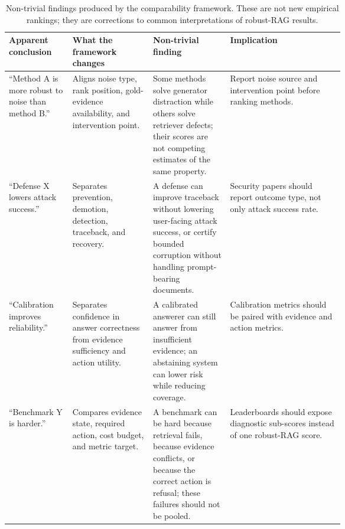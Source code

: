 \begin{table}[t]
\centering
\scriptsize
\renewcommand{\arraystretch}{0.9}
\begin{tabularx}{\linewidth}{>{\raggedright\arraybackslash}p{0.19\linewidth}>{\raggedright\arraybackslash}p{0.24\linewidth}>{\raggedright\arraybackslash}p{0.23\linewidth}X}
\toprule
\textbf{Apparent conclusion} & \textbf{What the framework changes} & \textbf{Non-trivial finding} & \textbf{Implication} \\
\midrule
``Method A is more robust to noise than method B.'' & Aligns noise type, rank position, gold-evidence availability, and intervention point. & Some methods solve generator distraction while others solve retriever defects; their scores are not competing estimates of the same property. & Report noise source and intervention point before ranking methods. \\
``Defense X lowers attack success.'' & Separates prevention, demotion, detection, traceback, and recovery. & A defense can improve traceback without lowering user-facing attack success, or certify bounded corruption without handling prompt-bearing documents. & Security papers should report outcome type, not only attack success rate. \\
``Calibration improves reliability.'' & Separates confidence in answer correctness from evidence sufficiency and action utility. & A calibrated answerer can still answer from insufficient evidence; an abstaining system can lower risk while reducing coverage. & Calibration metrics should be paired with evidence and action metrics. \\
``Benchmark Y is harder.'' & Compares evidence state, required action, cost budget, and metric target. & A benchmark can be hard because retrieval fails, because evidence conflicts, or because the correct action is refusal; these failures should not be pooled. & Leaderboards should expose diagnostic sub-scores instead of one robust-RAG score. \\
\bottomrule
\end{tabularx}
\caption{Non-trivial findings produced by the comparability framework. These are not new empirical rankings; they are corrections to common interpretations of robust-RAG results.}
\label{tab:nontrivial-findings}
\end{table}

